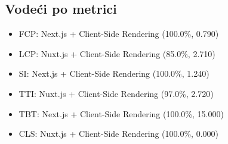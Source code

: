 \subsection{Vodeći po metrici}
\begin{itemize}
    \item FCP: Next.js + Client-Side Rendering (100.0\%, 0.790)
    \item LCP: Nuxt.js + Client-Side Rendering (85.0\%, 2.710)
    \item SI: Next.js + Client-Side Rendering (100.0\%, 1.240)
    \item TTI: Nuxt.js + Client-Side Rendering (97.0\%, 2.720)
    \item TBT: Next.js + Client-Side Rendering (100.0\%, 15.000)
    \item CLS: Nuxt.js + Client-Side Rendering (100.0\%, 0.000)
\end{itemize}

